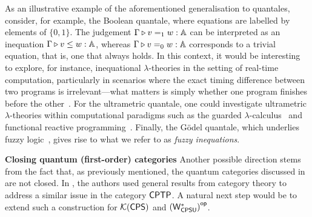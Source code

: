 As an illustrative example of the aforementioned generalisation to quantales, consider, for example, the Boolean quantale, where equations are labelled by elements of $\{0,1\}$. The judgement $\Gamma \triangleright v =_{1} w : \mathbb{A}$ can be interpreted as an inequation $\Gamma \triangleright v \leq w : \mathbb{A}$, whereas $\Gamma \triangleright v =_{0} w : \mathbb{A}$ corresponds to a trivial equation, that is, one that always holds.  In this context, it would be interesting to explore, for instance, inequational $\lambda$-theories in the setting of real-time computation, particularly in scenarios where the exact timing difference between two programs is irrelevant---what matters is simply whether one program finishes before the other~\cite{dahlqvist2023syntactic}. For the ultrametric quantale, one could investigate ultrametric $\lambda$-theories within computational paradigms such as the guarded $\lambda$-calculus~\cite{guarded_ultrametric} and functional reactive programming~\cite{Ultrametric_reactive}. Finally, the Gödel quantale, which underlies fuzzy logic~\cite{deneckeGaloisConnectionsApplications2004}, gives rise to what we refer to as \emph{fuzzy inequations}.








\textbf{Closing quantum (first-order) categories}
Another possible direction stems from the fact that, as previously mentioned, the quantum categories discussed in  are not closed. In \cite{dahlqvist2023syntactic}, the authors used general results from category theory to address a similar issue in the category $\mathsf{CPTP}$. A natural next step would be to extend such a construction for $\mathcal{K}(\mathsf{CPS})$ and $\left(\mathsf{W^*_{CPSU}}\right)^{\mathsf{op}}$.


